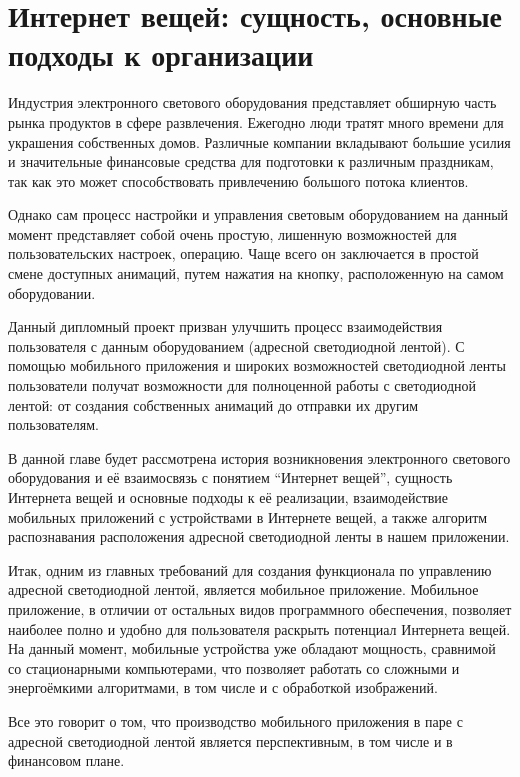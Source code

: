 \section{Интернет вещей: сущность, основные подходы к организации}
\label{sec:subject}

Индустрия электронного светового оборудования представляет обширную часть рынка продуктов в сфере развлечения. Ежегодно люди тратят много времени для украшения собственных домов. Различные компании вкладывают большие усилия и значительные финансовые средства для подготовки к различным праздникам, так как это может способствовать привлечению большого потока клиентов.

Однако сам процесс настройки и управления световым оборудованием на данный момент представляет собой очень простую, лишенную возможностей для пользовательских настроек, операцию. Чаще всего он заключается в простой смене доступных анимаций, путем нажатия на кнопку, расположенную на самом оборудовании.

Данный дипломный проект призван улучшить процесс взаимодействия пользователя с данным оборудованием (адресной светодиодной лентой). С помощью мобильного приложения и широких возможностей светодиодной ленты пользователи получат возможности для полноценной работы с светодиодной лентой: от создания собственных анимаций до отправки их другим пользователям.

В данной главе будет рассмотрена история возникновения электронного светового оборудования и её взаимосвязь с понятием \enquote{Интернет вещей}, сущность Интернета вещей и основные подходы к её реализации, взаимодействие мобильных приложений с устройствами в Интернете вещей, а также алгоритм распознавания расположения адресной светодиодной ленты в нашем приложении.









% 

Итак, одним из главных требований для создания функционала по управлению адресной светодиодной лентой, является мобильное приложение. Мобильное приложение, в отличии от остальных видов программного обеспечения, позволяет наиболее полно и удобно для пользователя раскрыть потенциал Интернета вещей. На данный момент, мобильные устройства уже обладают мощность, сравнимой со стационарными компьютерами, что позволяет работать со сложными и энергоёмкими алгоритмами, в том числе и с обработкой изображений.

Все это говорит о том, что производство мобильного приложения в паре с адресной светодиодной лентой является перспективным, в том числе и в финансовом плане.